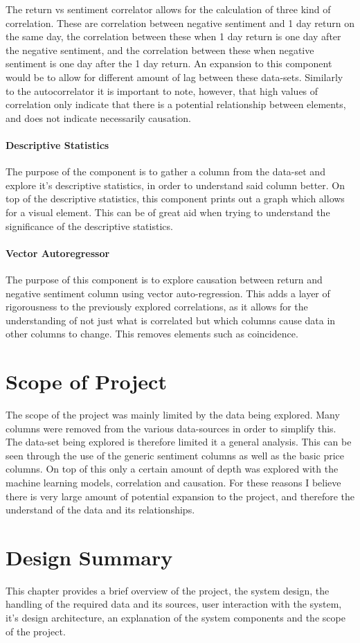 The return vs sentiment correlator allows for the calculation of three kind of correlation. These are correlation between negative sentiment and 1 day return on the same day, the correlation between these when 1 day return is one day after the negative sentiment, and the correlation between these when negative sentiment is one day after the 1 day return. An expansion to this component would be to allow for different amount of lag between these data-sets. Similarly to the autocorrelator it is important to note, however, that high values of correlation only indicate that there is a potential relationship between elements, and does not indicate necessarily causation.

\paragraph{Descriptive Statistics}

The purpose of the component is to gather a column from the data-set and explore it's descriptive statistics, in order to understand said column better. On top of the descriptive statistics, this component prints out a graph which allows for a visual element. This can be of great aid when trying to understand the significance of the descriptive statistics.

\paragraph{Vector Autoregressor}

The purpose of this component is to explore causation between return and negative sentiment column using vector auto-regression. This adds a layer of rigorousness to the previously explored correlations, as it allows for the understanding of not just what is correlated but which columns cause data in other columns to change. This removes elements such as coincidence.

\section{Scope of Project}

The scope of the project was mainly limited by the data being explored. Many columns were removed from the various data-sources in order to simplify this. The data-set being explored is therefore limited it a general analysis. This can be seen through the use of the generic sentiment columns as well as the basic price columns. On top of this only a certain amount of depth was explored with the machine learning models, correlation and causation. For these reasons I believe there is very large amount of potential expansion to the project, and therefore the understand of the data and its relationships.

\section{Design Summary}

This chapter provides a brief overview of the project, the system design, the handling of the required data and its sources, user interaction with the system, it's design architecture, an explanation of the system components and the scope of the project.